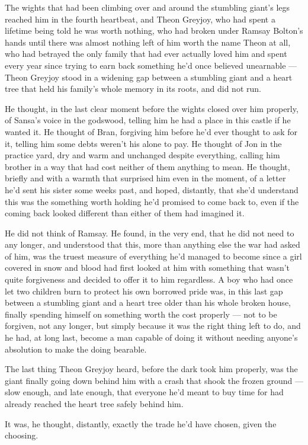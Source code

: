 The wights that had been climbing over and around the stumbling giant’s legs reached him in the fourth heartbeat, and Theon Greyjoy, who had spent a lifetime being told he was worth nothing, who had broken under Ramsay Bolton’s hands until there was almost nothing left of him worth the name Theon at all, who had betrayed the only family that had ever actually loved him and spent every year since trying to earn back something he’d once believed unearnable — Theon Greyjoy stood in a widening gap between a stumbling giant and a heart tree that held his family’s whole memory in its roots, and did not run.

\sceneBreak

He thought, in the last clear moment before the wights closed over him properly, of Sansa’s voice in the godswood, telling him he had a place in this castle if he wanted it. He thought of Bran, forgiving him before he’d ever thought to ask for it, telling him some debts weren’t his alone to pay. He thought of Jon in the practice yard, dry and warm and unchanged despite everything, calling him brother in a way that had cost neither of them anything to mean. He thought, briefly and with a warmth that surprised him even in the moment, of a letter he’d sent his sister some weeks past, and hoped, distantly, that she’d understand this was the something worth holding he’d promised to come back to, even if the coming back looked different than either of them had imagined it.

He did not think of Ramsay. He found, in the very end, that he did not need to any longer, and understood that this, more than anything else the war had asked of him, was the truest measure of everything he’d managed to become since a girl covered in snow and blood had first looked at him with something that wasn’t quite forgiveness and decided to offer it to him regardless. A boy who had once let two children burn to protect his own borrowed pride was, in this last gap between a stumbling giant and a heart tree older than his whole broken house, finally spending himself on something worth the cost properly — not to be forgiven, not any longer, but simply because it was the right thing left to do, and he had, at long last, become a man capable of doing it without needing anyone’s absolution to make the doing bearable.

The last thing Theon Greyjoy heard, before the dark took him properly, was the giant finally going down behind him with a crash that shook the frozen ground — slow enough, and late enough, that everyone he’d meant to buy time for had already reached the heart tree safely behind him.

It was, he thought, distantly, exactly the trade he’d have chosen, given the choosing.